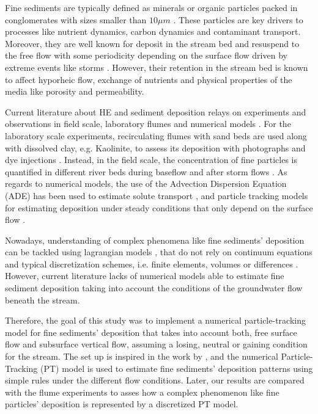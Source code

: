 \documentclass[draft,linenumbers]{agujournal2018}
\begin{document}
Fine sediments are typically defined as minerals or organic particles packed in conglomerates with sizes smaller than $10\mu m$ \citep{Drummond2014,Drummond2018}. These particles are key drivers to processes like nutrient dynamics, carbon dynamics and contaminant transport. Moreover, they are well known for deposit in the stream bed and resuspend to the free flow with some periodicity \citep{Drummond2015} depending on the surface flow driven by extreme events like storms \citep{Drummond2017}. However, their retention in the stream bed is known to affect hyporheic flow, exchange of nutrients and physical properties of the media like porosity and permeability. 

Current literature about HE and sediment deposition relays on experiments and observations in field scale, laboratory flumes and numerical models \citep{Salehin2004a,Marion2002,Fox2014,Fox2018}. For the laboratory scale experiments, recirculating flumes with sand beds are used along with dissolved clay, e.g. Kaolinite, to assess its deposition with photographs and dye injections \citep{Fox2014,Fox2018}. Instead, in the field scale, the concentration of fine particles is quantified in different river beds during baseflow and after storm flows \citep{Drummond2017}. As regards to numerical models, the use of the Advection Dispersion Equation (ADE) has been used to estimate solute transport \citep{Boano2007b,BayaniCardenas2008c}, and particle tracking models for estimating deposition under steady conditions that only depend on the surface flow \citep{Packman2000}. 

Nowadays, understanding of complex phenomena like fine sediments' deposition can be tackled using lagrangian models \citep{Schumer2009}, that do not rely on continuum equations and typical discretization schemes, i.e. finite elements, volumes or differences \citep{Noetinger2016}. However, current literature lacks of numerical models able to estimate fine sediment deposition taking into account the conditions of the groundwater flow beneath the stream.

Therefore, the goal of this study was to implement a numerical particle-tracking model for fine sediments' deposition that takes into account both, free surface flow and subsurface vertical flow, assuming a losing, neutral or gaining condition for the stream. The set up is inspired in the work by \citet{Fox2014,Fox2018}, and the numerical Particle-Tracking (PT) model is used to estimate fine sediments' deposition patterns using simple rules under the different flow conditions. Later, our results are compared with the flume experiments to asses how a complex phenomenon like fine particles' deposition is represented by a discretized PT model. 
\end{document}
